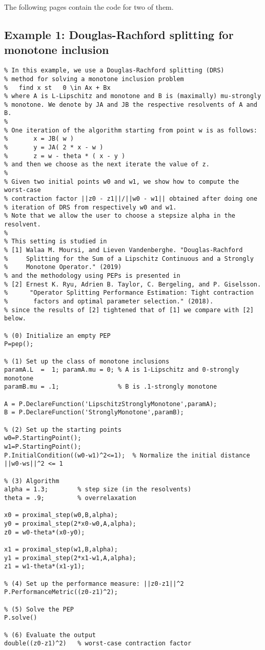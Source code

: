 \documentclass[11pt,a4paper]{article}
\begin{document}
The following pages contain the code for two of them.
\clearpage
\subsection{Example 1: Douglas-Rachford splitting for monotone inclusion}
\begin{lstlisting}
% In this example, we use a Douglas-Rachford splitting (DRS) 
% method for solving a monotone inclusion problem
%   find x st   0 \in Ax + Bx 
% where A is L-Lipschitz and monotone and B is (maximally) mu-strongly
% monotone. We denote by JA and JB the respective resolvents of A and B.
%
% One iteration of the algorithm starting from point w is as follows:
%       x = JB( w )
%       y = JA( 2 * x - w )
%       z = w - theta * ( x - y )
% and then we choose as the next iterate the value of z.
%
% Given two initial points w0 and w1, we show how to compute the worst-case
% contraction factor ||z0 - z1||/||w0 - w1|| obtained after doing one
% iteration of DRS from respectively w0 and w1.
% Note that we allow the user to choose a stepsize alpha in the resolvent.
%
% This setting is studied in
% [1] Walaa M. Moursi, and Lieven Vandenberghe. "Douglas-Rachford
%     Splitting for the Sum of a Lipschitz Continuous and a Strongly
%     Monotone Operator." (2019)
% and the methodology using PEPs is presented in
% [2] Ernest K. Ryu, Adrien B. Taylor, C. Bergeling, and P. Giselsson.
%      "Operator Splitting Performance Estimation: Tight contraction
%       factors and optimal parameter selection." (2018).
% since the results of [2] tightened that of [1] we compare with [2] below.

% (0) Initialize an empty PEP
P=pep();

% (1) Set up the class of monotone inclusions
paramA.L  =  1; paramA.mu = 0; % A is 1-Lipschitz and 0-strongly monotone
paramB.mu = .1;                % B is .1-strongly monotone

A = P.DeclareFunction('LipschitzStronglyMonotone',paramA);
B = P.DeclareFunction('StronglyMonotone',paramB);

% (2) Set up the starting points
w0=P.StartingPoint();
w1=P.StartingPoint();
P.InitialCondition((w0-w1)^2<=1);  % Normalize the initial distance ||w0-ws||^2 <= 1

% (3) Algorithm
alpha = 1.3;		% step size (in the resolvents)
theta = .9;         % overrelaxation

x0 = proximal_step(w0,B,alpha);
y0 = proximal_step(2*x0-w0,A,alpha);
z0 = w0-theta*(x0-y0);

x1 = proximal_step(w1,B,alpha);
y1 = proximal_step(2*x1-w1,A,alpha);
z1 = w1-theta*(x1-y1);

% (4) Set up the performance measure: ||z0-z1||^2
P.PerformanceMetric((z0-z1)^2);

% (5) Solve the PEP
P.solve()

% (6) Evaluate the output
double((z0-z1)^2)   % worst-case contraction factor
\end{lstlisting}
\clearpage
\end{document}
